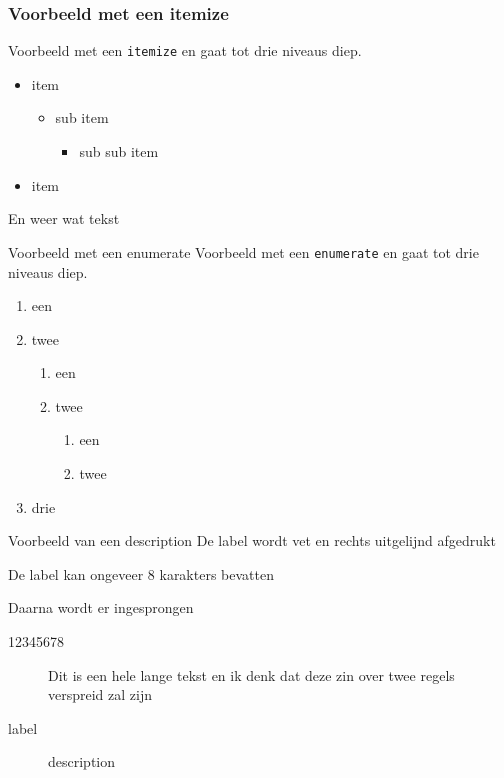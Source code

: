 \documentclass[fleqn,aspectratio=169,dutch]{beamer}
\begin{document}
\begin{frame}
\frametitle{Voorbeeld met een itemize}
Voorbeeld met een \texttt{itemize} en gaat tot drie niveaus diep.
\begin{itemize}
\item item
\begin{itemize}
\item sub item
\begin{itemize}
\item sub sub item
\end{itemize}
\end{itemize}
\item item
\end{itemize}
En weer wat tekst
\end{frame}

\begin{frame}{Voorbeeld met een enumerate}
Voorbeeld met een \texttt{enumerate} en gaat tot drie niveaus diep.
\begin{enumerate}
\item een
\item twee
\begin{enumerate}
\item een
\item twee
\begin{enumerate}
\item een
\item twee
\end{enumerate}
\end{enumerate}
\item drie
\end{enumerate}
\end{frame}


\begin{frame}{Voorbeeld van een description}
De label wordt vet en rechts uitgelijnd afgedrukt

De label kan ongeveer 8 karakters bevatten

Daarna wordt er ingesprongen
\begin{description}
\item[12345678] Dit is een hele lange tekst en ik denk dat deze zin over twee regels verspreid zal zijn
\item[label] description
\end{description}
\end{frame}
\end{document}
